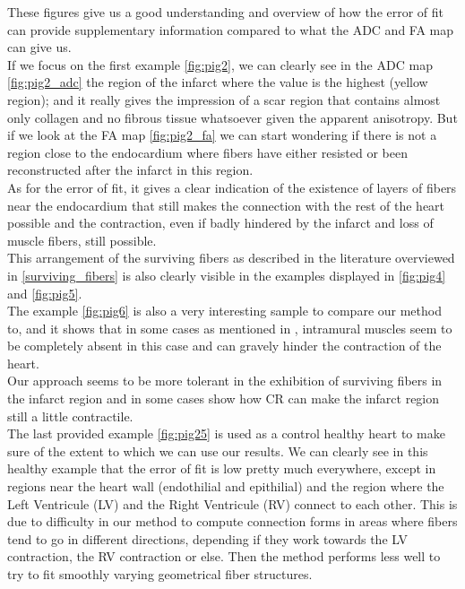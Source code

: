 These figures give us a good understanding and overview of how the error of fit can provide supplementary information compared to what the ADC and FA map can give us.\\
If we focus on the first example \ref{fig:pig2}, we can clearly see in the ADC map \ref{fig:pig2_adc} the region of the infarct where the value is the highest (yellow region); and it really gives the impression of a scar region that contains almost only collagen and no fibrous tissue whatsoever given the apparent anisotropy. But if we look at the FA map \ref{fig:pig2_fa} we can start wondering if there is not a region close to the endocardium where fibers have either resisted or been reconstructed after the infarct in this region.\\
As for the error of fit, it gives a clear indication of the existence of layers of fibers near the endocardium that still makes the connection with the rest of the heart possible and the contraction, even if badly hindered by the infarct and loss of muscle fibers, still possible.\\
This arrangement of the surviving fibers as described in the literature overviewed in \ref{surviving_fibers} is also clearly visible in the examples displayed in \ref{fig:pig4} and \ref{fig:pig5}.\\
The example \ref{fig:pig6} is also a very interesting sample to compare our method to, and it shows that in some cases as mentioned in \cite{ursell1985structural}, intramural muscles seem to be completely absent in this case and can gravely hinder the contraction of the heart.\\
Our approach seems to be more tolerant in the exhibition of surviving fibers in the infarct region and in some cases show how CR can make the infarct region still a little contractile.\\
The last provided example \ref{fig:pig25} is used as a control healthy heart to make sure of the extent to which we can use our results. We can clearly see in this healthy example that the error of fit is low pretty much everywhere, except in regions near the heart wall (endothilial and epithilial) and the region where the Left Ventricule (LV) and the Right Ventricule (RV) connect to each other. This is due to difficulty in our method to compute connection forms in areas where fibers tend to go in different directions, depending if they work towards the LV contraction, the RV contraction or else. Then the method performs less well to try to fit smoothly varying geometrical fiber structures.

